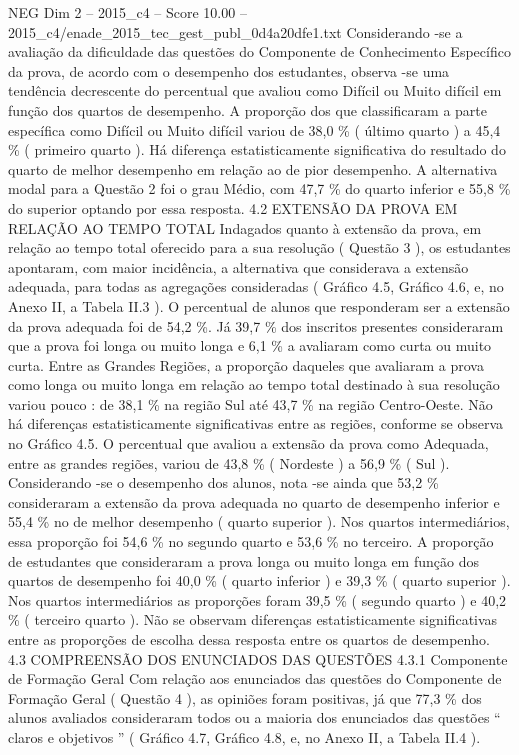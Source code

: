 \begin{textsample}{NEG Dim 2 – 2015\_c4 – Score 10.00 – 2015\_c4/enade\_2015\_tec\_gest\_publ\_0d4a20dfe1.txt}
Considerando -se a avaliação da dificuldade das questões do Componente de Conhecimento Específico da prova, de acordo com o desempenho dos estudantes, observa -se uma tendência decrescente do percentual que avaliou como Difícil ou Muito difícil em função dos quartos de desempenho.
A proporção dos que classificaram a parte específica como Difícil ou Muito difícil variou de 38,0 \% ( último quarto ) a 45,4 \% ( primeiro quarto ).
Há diferença estatisticamente significativa do resultado do quarto de melhor desempenho em relação ao de pior desempenho.
A alternativa modal para a Questão 2 foi o grau Médio, com 47,7 \% do quarto inferior e 55,8 \% do superior optando por essa resposta. 4.2 EXTENSÃO DA PROVA EM RELAÇÃO AO TEMPO TOTAL Indagados quanto à extensão da prova, em relação ao tempo total oferecido para a sua resolução ( Questão 3 ), os estudantes apontaram, com maior incidência, a alternativa que considerava a extensão adequada, para todas as agregações consideradas ( Gráfico 4.5, Gráfico 4.6, e, no Anexo II, a Tabela II.3 ).
O percentual de alunos que responderam ser a extensão da prova adequada foi de 54,2 \%.
Já 39,7 \% dos inscritos presentes consideraram que a prova foi longa ou muito longa e 6,1 \% a avaliaram como curta ou muito curta.
Entre as Grandes Regiões, a proporção daqueles que avaliaram a prova como longa ou muito longa em relação ao tempo total destinado à sua resolução variou pouco : de 38,1 \% na região Sul até 43,7 \% na região Centro-Oeste.
Não há diferenças estatisticamente significativas entre as regiões, conforme se observa no Gráfico 4.5.
O percentual que avaliou a extensão da prova como Adequada, entre as grandes regiões, variou de 43,8 \% ( Nordeste ) a 56,9 \% ( Sul ).
Considerando -se o desempenho dos alunos, nota -se ainda que 53,2 \% consideraram a extensão da prova adequada no quarto de desempenho inferior e 55,4 \% no de melhor desempenho ( quarto superior ).
Nos quartos intermediários, essa proporção foi 54,6 \% no segundo quarto e 53,6 \% no terceiro.
A proporção de estudantes que consideraram a prova longa ou muito longa em função dos quartos de desempenho foi 40,0 \% ( quarto inferior ) e 39,3 \% ( quarto superior ).
Nos quartos intermediários as proporções foram 39,5 \% ( segundo quarto ) e 40,2 \% ( terceiro quarto ).
Não se observam diferenças estatisticamente significativas entre as proporções de escolha dessa resposta entre os quartos de desempenho. 4.3 COMPREENSÃO DOS ENUNCIADOS DAS QUESTÕES 4.3.1 Componente de Formação Geral Com relação aos enunciados das questões do Componente de Formação Geral ( Questão 4 ), as opiniões foram positivas, já que 77,3 \% dos alunos avaliados consideraram todos ou a maioria dos enunciados das questões “ claros e objetivos ” ( Gráfico 4.7, Gráfico 4.8, e, no Anexo II, a Tabela II.4 ).

\end{textsample}
